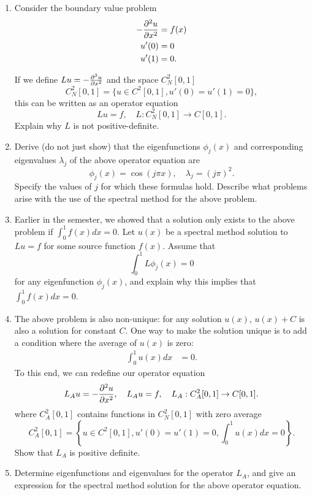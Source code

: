 \begin{enumerate}
\item Consider the boundary value problem
\begin{align*}
-\frac{\partial^{2} u}{\partial x^{2}} &= f(x)\\
u'(0) &= 0\\
u'(1) &= 0.
\end{align*}

If we define $Lu = -\frac{\partial^{2} u}{\partial x^{2}}$ and the space $C^2_N[0,1]$
\[
C^2_{ N}[0,1] = \{u\in C^2[0,1], u'(0) = u'(1) = 0\},
\]
this can be written as an operator equation
\[
Lu = f, \quad L:C^2_{ N}[0,1] \rightarrow C[0,1].
\]
Explain why $L$ is not positive-definite.  
\item Derive (do not just show) that the eigenfunctions $\phi_j(x)$ and corresponding eigenvalues $\lambda_j$ of the above operator equation are
\[
\phi_j(x) = \cos(j\pi x), \quad \lambda_j = (j\pi)^2.
\]
Specify the values of $j$ for which these formulas hold.  Describe what problems arise with the use of the spectral method for the above problem.  %
\item Earlier in the semester, we showed that a solution only exists to the above problem if $\int_0^1 f(x)dx = 0.$  Let $u(x)$ be a spectral method solution to $Lu = f$ for some source function $f(x)$.  Assume that
\[
\int_0^1 L\phi_j(x) = 0
\]
for any eigenfunction $\phi_j(x)$, and explain why this implies that $\int_0^1 f(x) dx =0$.
\item The above problem is also non-unique: for any solution $u(x)$, $u(x) + C$ is also a solution for constant $C$.  One way to make the solution unique is to add a condition where the average of $u(x)$ is zero: 
\begin{align*}
\int_0^1 u(x)dx &= 0.
\end{align*}
To this end, we can redefine our operator equation 
\[
L_Au = -\frac{\partial^{2} u}{\partial x^{2}}, \quad L_Au = f, \quad L_A:C^2_{A}[0,1] \rightarrow C[0,1].
\]
where $C^2_A[0,1]$ contains functions in $C^2_N[0,1]$  with zero average
\[
C^2_{A}[0,1] = \left\{u\in C^2[0,1], u'(0) = u'(1) = 0, \int_0^1 u(x) dx = 0\right\}.
\]
Show that $L_A$ is positive definite.
\item Determine eigenfunctions and eigenvalues for the operator $L_A$, and give an expression for the spectral method solution for the above operator equation.  
\end{enumerate}

